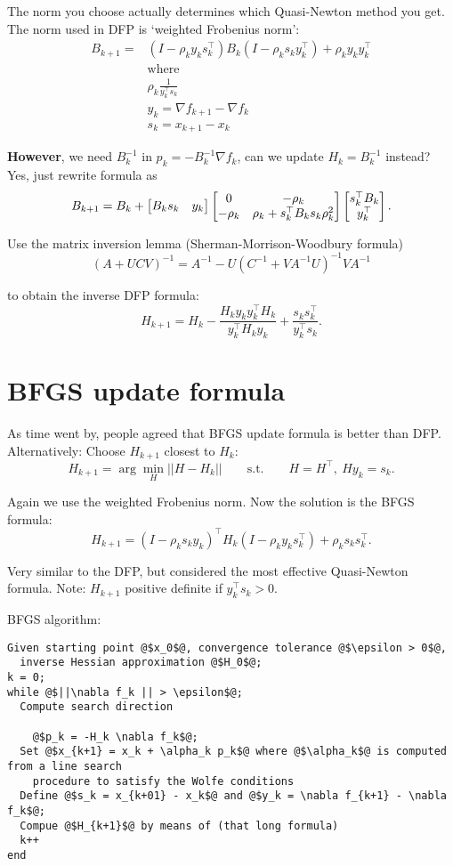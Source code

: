 \documentclass{article}
\begin{document}
The norm you choose actually determines which Quasi-Newton method you get. The norm used in DFP is `weighted Frobenius norm':
\begin{align*}
  B_{k+1} =& (I - \rho_k y_k s_k^{\top})B_k (I - \rho_k s_k y_k^{\top}) + \rho_k y_k y_k^{\top} \\ 
  &\text{where } \\ 
   &\rho_k \frac{1}{y_k ^{\top}s_k} \\ 
   &y_k = \nabla f_{k+1} - \nabla f_k \\ 
   &s_k = x_{k+1} - x_k
\end{align*}

\textbf{However}, we need $B_k^{-1}$ in $p_k = -B_k^{-1} \nabla f_k$, can we update $H_k = B_k^{-1}$ instead?
Yes, just rewrite formula as 
\[
  B_{k+1} = B_k + \begin{bmatrix} B_k s_k  & y_k \end{bmatrix}\begin{bmatrix} 0 & -\rho_k  \\ -\rho_k  & \rho_k + s_k^{\top}B_k s_k \rho_k^2 \end{bmatrix}\begin{bmatrix} s_k^{\top} B_k \\ y_k^{\top} \end{bmatrix}
.\] 

Use the matrix inversion lemma (Sherman-Morrison-Woodbury formula)
\[
  (A+UCV)^{-1} = A^{-1}- U(C^{-1}+ VA^{-1}U)^{-1}VA^{-1}
\] 

to obtain the inverse DFP formula:
\[
  H_{k+1} = H_k - \frac{H_k y_k y_k^{\top}H_k}{y_k^{\top}H_k y_k} + \frac{s_k s_k^{\top}}{y_k^{\top}s_k}
.\] 

\section{BFGS update formula}

As time went by, people agreed that BFGS update formula is better than DFP.
Alternatively: Choose $H_{k+1}$ closest to $H_k$: 
\[
  H_{k+1} = \arg \min_H ||H - H_k|| \qquad\text{s.t.}\qquad H = H^{\top} ,\ Hy_k = s_k
.\] 

Again we use the weighted Frobenius norm. Now the solution is the BFGS formula:
\[
  H_{k+1} = (I- \rho_k s_k y_k)^{\top}H_k (I-\rho_k y_k s_k^{\top}) + \rho_k s_k s_k^{\top}
.\] 

Very similar to the DFP, but considered the most effective Quasi-Newton formula. 
Note: $H_{k+1}$ positive definite if $y_k^{\top} s_k > 0$.

\medskip BFGS algorithm: 
\lstset{basicstyle=\ttfamily}
\begin{lstlisting}
Given starting point @$x_0$@, convergence tolerance @$\epsilon > 0$@,
  inverse Hessian approximation @$H_0$@;
k = 0;
while @$||\nabla f_k || > \epsilon$@; 
  Compute search direction 
  
    @$p_k = -H_k \nabla f_k$@; 
  Set @$x_{k+1} = x_k + \alpha_k p_k$@ where @$\alpha_k$@ is computed from a line search 
    procedure to satisfy the Wolfe conditions 
  Define @$s_k = x_{k+01} - x_k$@ and @$y_k = \nabla f_{k+1} - \nabla f_k$@; 
  Compue @$H_{k+1}$@ by means of (that long formula)
  k++
end
\end{lstlisting}
\end{document}
